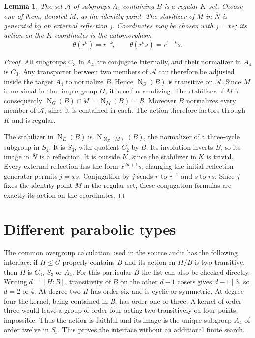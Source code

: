 \documentclass[11pt]{article}
\newtheorem{lemma}{Lemma}
\newcommand{\N}{\operatorname{N}}
\begin{document}
\begin{lemma}\label{regular}
The set $\mathcal A$ of subgroups $A_4$ containing $B$ is a regular
$K$-set. Choose one of them, denoted $M$, as the identity point.
The stabilizer of $M$ in $\overline N$ is generated by an external
reflection $j$. Coordinates may be chosen with $j=xs$; its action
on the $K$-coordinates is the automorphism
\[
 \theta(r^k)=r^{-k},\qquad \theta(r^k s)=r^{1-k}s.
\]
\end{lemma}
\begin{proof}
All subgroups $C_3$ in $A_4$ are conjugate internally, and their
normalizer in $A_4$ is $C_3$. Any transporter between two members
of $\mathcal A$ can therefore be adjusted inside the target $A_4$
to normalize $B$. Hence $\N_G(B)$ is transitive on $\mathcal A$.
Since $M$ is maximal in the simple group $G$, it is self-normalizing.
The stabilizer of $M$ is consequently
$\N_G(B)\cap M=\N_M(B)=B$. Moreover $B$ normalizes every
member of $\mathcal A$, since it is contained in each. The action
therefore factors through $K$ and is regular.

The stabilizer in $\N_E(B)$ is $\N_{\N_E(M)}(B)$, the normalizer
of a three-cycle subgroup in $S_4$. It is $S_3$, with quotient $C_2$
by $B$. Its involution inverts $B$, so its image in $\overline N$
is a reflection. It is outside $K$, since the stabilizer in $K$ is
trivial. Every external reflection has the form $x^{2a+1}s$;
changing the initial reflection generator permits $j=xs$.
Conjugation by $j$ sends $r$ to $r^{-1}$ and $s$ to $rs$.
Since $j$ fixes the identity point $M$ in the regular set, these
conjugation formulas are exactly its action on the coordinates.
\end{proof}

\section{Different parabolic types}
The common overgroup calculation used in the source audit has the
following interface: if $H\le G$ properly contains $B$ and its action
on $H/B$ is two-transitive, then $H$ is $C_6$, $S_3$ or $A_4$.
For this particular $B$ the list can also be checked directly.
Writing $d=[H:B]$, transitivity of $B$ on the other $d-1$ cosets
gives $d-1\mid3$, so $d=2$ or $4$. At degree two $H$ has order
six and is cyclic or symmetric. At degree four the kernel, being
contained in $B$, has order one or three. A kernel of order three
would leave a group of order four acting two-transitively on four
points, impossible. Thus the action is faithful and its image is the
unique subgroup $A_4$ of order twelve in $S_4$. This proves the interface
without an additional finite search.
\end{document}
